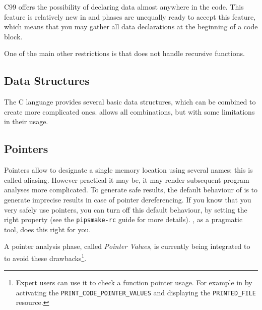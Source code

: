 \documentclass[a4paper]{article}
\begin{document}
C99 offers the possibility of declaring data almost anywhere in the
code. This feature is relatively new in \Apips and phases are unequally
ready to accept this feature, which means that you may gather all data
declarations at the beginning of a code block.

One of the main other restrictions is that \Apips does not handle
recursive functions.


\subsection{Data Structures}
\label{sec:data_structures}

The C language provides several basic data structures, which can be
combined to create more complicated ones. \Apips allows all combinations,
but with some limitations in their usage.


\subsection{Pointers}
\label{sec:pointers}

Pointers allow to designate a single memory location using several names:
this is called aliasing. However practical it may be, it may render
subsequent program analyses more complicated. To generate safe results,
the default behaviour of \Apips is to generate imprecise results in case
of pointer dereferencing. If you know that you very safely use
pointers, you can turn off this default behaviour, by setting the right
property (see the \texttt{pipsmake-rc} guide for more details). \Apfa, as
a pragmatic tool, does this right for you.

A pointer analysis phase, called \emph{Pointer Values}, is currently being
integrated to \Apips to avoid these drawbacks\footnote{Expert users can
  use it to check a function pointer usage. For example in \Apips by
  activating the \texttt{PRINT\_CODE\_POINTER\_VALUES} and displaying the
  \texttt{PRINTED\_FILE} resource.}.
\end{document}
